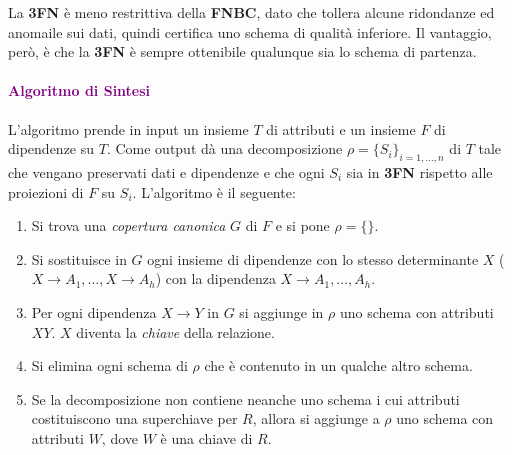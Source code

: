La \textbf{3FN} è meno restrittiva della \textbf{FNBC}, dato che tollera alcune ridondanze ed anomaile sui dati,
quindi certifica uno schema di qualità inferiore. Il vantaggio, però, è che la \textbf{3FN} è sempre
ottenibile qualunque sia lo schema di partenza.

\paragraph{\textcolor{purple}{Algoritmo di Sintesi}} L'algoritmo prende in
input un insieme $T$ di attributi e un insieme $F$ di dipendenze su $T$. Come
output dà una decomposizione $\rho = \{S_i\}_{i = 1, \dots, n}$ di $T$ tale
che vengano preservati dati e dipendenze e che ogni $S_i$ sia in \textbf{3FN} rispetto
alle proiezioni di $F$ su $S_i$. L'algoritmo è il seguente:
\begin{enumerate}
    \item Si trova una \emph{copertura canonica} $G$ di $F$ e si pone
        $\rho = \{\}$.
    \item Si sostituisce in $G$ ogni insieme di dipendenze con lo stesso determinante
        $X$ ($X \rightarrow A_1, \dots, X \rightarrow A_h$) con la dipendenza $X \rightarrow A_1, \dots, A_h$.
    \item Per ogni dipendenza $X \rightarrow Y$ in $G$ si aggiunge in $\rho$ uno schema
        con attributi $XY$. $X$ diventa la \emph{chiave} della relazione.
    \item Si elimina ogni schema di $\rho$ che è contenuto in un qualche altro schema.
    \item Se la decomposizione non contiene neanche uno schema i cui attributi costituiscono
        una superchiave per $R$, allora si aggiunge a $\rho$ uno schema con attributi $W$,
        dove $W$ è una chiave di $R$.
\end{enumerate}